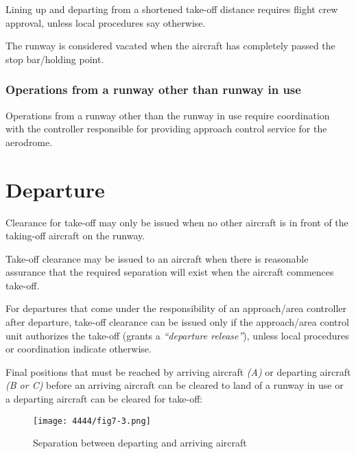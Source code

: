 Lining up and departing from a shortened take-off distance requires flight crew approval, unless local procedures say otherwise.

The runway is considered vacated when the aircraft has completely passed the stop bar/holding point.

\subsubsection{Operations from a runway other than runway in use}

Operations from a runway other than the runway in use require coordination with the controller responsible for providing approach control service for the aerodrome.

\section{Departure}

Clearance for take-off may only be issued when no other aircraft is in front of the taking-off aircraft on the runway.

Take-off clearance may be issued to an aircraft when there is reasonable assurance that the required separation  will exist when the aircraft commences take-off.

For departures that come under the responsibility of an approach/area controller after departure, take-off clearance can be issued only if the approach/area control unit authorizes the take-off (grants a \emph{``departure release''}), unless local procedures or coordination indicate otherwise.

Final positions that must be reached by arriving aircraft \emph{(A)} or departing aircraft \emph{(B or C)} before an arriving aircraft can be cleared to land of a runway in use or a departing aircraft can be cleared for take-off:

\begin{figure}[htbp]
    \centering
    \texttt{[image: 4444/fig7-3.png]}
    \caption{Separation between departing and arriving aircraft~\cite{4444}}
    \label{fig:separation_between_dep_and_arr}
\end{figure}

